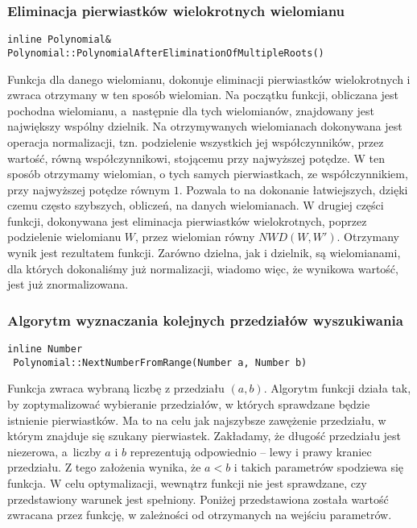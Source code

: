 \subsubsection{Eliminacja pierwiastków wielokrotnych wielomianu}
\begin{lstlisting}
inline Polynomial&
Polynomial::PolynomialAfterEliminationOfMultipleRoots()
\end{lstlisting}

Funkcja dla danego wielomianu, dokonuje eliminacji pierwiastków wielokrotnych i zwraca otrzymany w ten sposób wielomian. Na początku funkcji, obliczana jest pochodna wielomianu, a~następnie dla tych wielomianów, znajdowany jest największy wspólny dzielnik. Na otrzymywanych wielomianach dokonywana jest operacja normalizacji, tzn. podzielenie wszystkich jej współczynników, przez wartość, równą współczynnikowi, stojącemu przy najwyższej potędze. W ten sposób otrzymamy wielomian, o tych samych pierwiastkach, ze współczynnikiem, przy najwyższej potędze równym $1$. Pozwala to na dokonanie łatwiejszych, dzięki czemu często szybszych, obliczeń, na danych wielomianach. W drugiej części funkcji, dokonywana jest eliminacja pierwiastków wielokrotnych, poprzez podzielenie wielomianu $W$, przez wielomian równy $NWD(W, W')$. Otrzymany wynik jest rezultatem funkcji. Zarówno dzielna, jak i dzielnik, są wielomianami, dla których dokonaliśmy już normalizacji, wiadomo więc, że wynikowa wartość, jest już znormalizowana.

\subsubsection{Algorytm wyznaczania kolejnych przedziałów wyszukiwania}
\begin{lstlisting}
inline Number
 Polynomial::NextNumberFromRange(Number a, Number b)
\end{lstlisting}

Funkcja zwraca wybraną liczbę z przedziału $(a,b)$. Algorytm funkcji działa tak, by zoptymalizować wybieranie przedziałów, w których sprawdzane będzie istnienie pierwiastków. Ma to na celu jak najszybsze zawężenie przedziału, w którym znajduje się szukany pierwiastek. Zakładamy, że długość przedziału jest niezerowa, a~liczby $a$ i $b$ reprezentują odpowiednio -- lewy i prawy kraniec przedziału. Z tego założenia wynika, że $a<b$ i takich parametrów spodziewa się funkcja. W celu optymalizacji, wewnątrz funkcji nie jest sprawdzane, czy przedstawiony warunek jest spełniony. Poniżej przedstawiona została wartość zwracana przez funkcję, w zależności od otrzymanych na wejściu parametrów.


